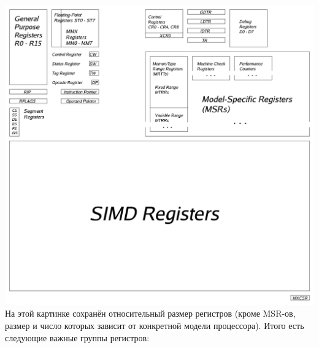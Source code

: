 \documentclass[11pt]{book}
\begin{document}
\includegraphics[width=6.5in]{pic/registers.png}
\\
На этой картинке сохранён относительный размер регистров (кроме MSR-ов, размер и число которых зависит от конкретной модели процессора).
Итого есть следующие важные группы регистров:
\end{document}
